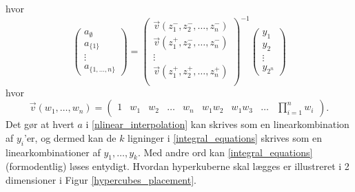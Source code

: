 \documentclass[a4paper, 12pt]{memoir}
\begin{document}
hvor 
\begin{equation}
\begin{pmatrix}
a_{\emptyset}\\
a_{\{1\}}\\
\vdots\\
a_{\{1, \dots, n\}}
\end{pmatrix}=\begin{pmatrix}
\vec{v}(z_1^{-},z_2^-, \dots, z_n^-)\\
\vec{v}(z_1^{+},z_2^-, \dots, z_n^-)\\
\vdots\\
\vec{v}(z_1^{+},z_2^+, \dots, z_n^+)\\
\end{pmatrix}^{-1}
\begin{pmatrix}
y_1\\
y_2\\
\vdots\\
y_{2^n}
\end{pmatrix}\label{a_solution}
\end{equation}
hvor
\begin{equation*}
\vec{v}(w_1, \dots, w_n)=\begin{pmatrix}
1 & w_1 & w_2 & \dots & w_n & w_1w_2 & w_1w_3 & \dots & \prod_{i=1}^nw_i
\end{pmatrix}.
\end{equation*}
Det gør at hvert $a$ i \eqref{nlinear_interpolation} kan skrives som en linearkombination af $y_i$'er, og dermed kan de $k$ ligninger i \eqref{integral_equations} skrives som en linearkombinationer af $y_1, \dots, y_k$. Med andre ord kan \eqref{integral_equations} (formodentlig) løses entydigt. Hvordan hyperkuberne skal lægges er illustreret i 2 dimensioner i Figur \ref{hypercubes_placement}. 
\end{document}

